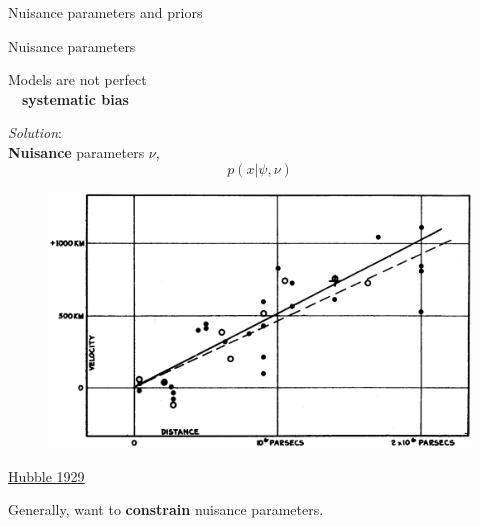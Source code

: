 \documentclass[
aspectratio=169,
14pt,
professionalfonts
]{beamer}
\newcommand{\arrow}{~\ding{220}~}
\begin{document}
\begin{frame}
    \center
    \Large
    Nuisance parameters and priors
    \end{frame}
    
    \begin{frame}{Nuisance parameters}

        \begin{minipage}{0.49\textwidth}
            Models are not perfect \\
            \arrow \textbf{systematic bias}

            \vspace{0.5cm}
            \textit{Solution}: \\
            \textbf{Nuisance} parameters $\nu$,
            $$p(x|\psi, \nu)$$
        \end{minipage}
        \begin{minipage}{0.49\textwidth}
            \begin{figure}
                \centering
                \includegraphics[width=\textwidth]{../plots/hubble.png}
            \end{figure}
            \flushright \small
            \href{https://www.pnas.org/doi/10.1073/pnas.15.3.168}{Hubble 1929}
        \end{minipage}
    \vspace{0.5cm}
    
    
    Generally, want to \textbf{constrain} nuisance parameters.
    
\end{frame}
    
\end{document}
